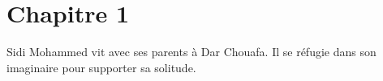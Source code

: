 \section{Chapitre 1}
Sidi Mohammed vit avec ses parents à Dar Chouafa. Il se réfugie dans son imaginaire pour supporter sa solitude.
